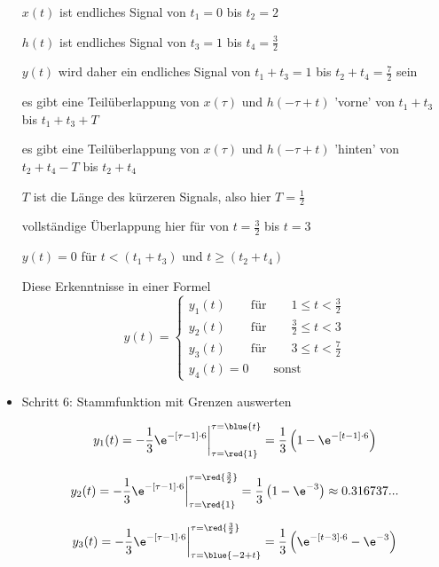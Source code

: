 \begin{ExCalc}
\begin{itemize}
  $x(t)$ ist endliches Signal von $t_1=0$ bis $t_2=2$

  $h(t)$ ist endliches Signal von $t_3=1$ bis $t_4=\frac{3}{2}$

  $y(t)$ wird daher ein endliches Signal von $t_1+t_3=1$ bis $t_2+t_4=\frac{7}{2}$ sein

  es gibt eine Teilüberlappung von $x(\tau)$ und $h(-\tau+t)$  'vorne' von
  $t_1+t_3$ bis $t_1+t_3+T$

  es gibt eine Teilüberlappung von $x(\tau)$ und $h(-\tau+t)$  'hinten' von
  $t_2+t_4-T$ bis $t_2+t_4$

  $T$ ist die Länge des kürzeren Signals, also hier $T=\frac{1}{2}$

  vollständige Überlappung hier für von $t = \frac{3}{2}$ bis $t=3$

  $y(t)=0$ für $t<(t_1+t_3)$ und $t\geq(t_2+t_4)$

  Diese Erkenntnisse in einer Formel
  \begin{equation}
  y(t) =
  \begin{cases}
    y_1(t) \qquad \mathrm{für} \qquad 1 \leq t < \frac{3}{2}\\
    y_2(t) \qquad \mathrm{für} \qquad \frac{3}{2} \leq t < 3\\
    y_3(t) \qquad \mathrm{für} \qquad 3 \leq t < \frac{7}{2}\\
    y_4(t)=0 \qquad \mathrm{sonst}
  \end{cases}
  \end{equation}

  \item Schritt 6:  Stammfunktion mit Grenzen auswerten

  \begin{equation}
  y_1(t) = -\frac{1}{3}\e^{-[\tau-1]\cdot 6}\bigg|_{\tau=\red{1}}^{\tau=\blue{t}}
  = \frac{1}{3}\left(1-\e^{-[t-1] \cdot 6}\right)
  \end{equation}

  \begin{equation}
  y_2(t) = -\frac{1}{3}\e^{-[\tau-1]\cdot 6}\bigg|_{\tau=\red{1}}^{\tau=\red{\frac{3}{2}}}  =
  \frac{1}{3}\left(1-\e^{-3}\right) \approx 0.316737...
  \end{equation}

  \begin{equation}
  y_3(t) = -\frac{1}{3}\e^{-[\tau-1]\cdot 6}\bigg|_{\tau=\blue{-2+t}}^{\tau=\red{\frac{3}{2}}} =
  \frac{1}{3}\left(\e^{-[t-3] \cdot 6} - \e^{-3}\right)
  \end{equation}
\end{itemize}
\end{ExCalc}


